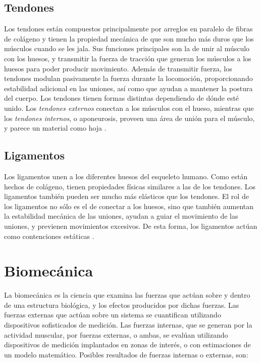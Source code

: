 \subsection{Tendones}

Los tendones están compuestos principalmente por arreglos en paralelo de fibras de colágeno y tienen la propiedad mecánica de que son mucho más duros que los músculos cuando se les jala. Sus funciones principales son la de unir al músculo con los huesos, y transmitir la fuerza de tracción que generan los músculos a los huesos para poder producir movimiento. Además de transmitir fuerza, los tendones modulan pasivamente la fuerza durante la locomoción, proporcionando estabilidad adicional en las uniones, así como que ayudan a mantener la postura del cuerpo. Los tendones tienen formas distintas dependiendo de dónde esté unido. Los \textit{tendones externos} conectan a los músculos con el hueso, mientras que los \textit{tendones internos}, o aponeurosis, proveen una área de unión para el músculo, y parece un material como hoja \citep{oatis2009kynesiology, biomechanics2012nordin}.

\subsection{Ligamentos}

Los ligamentos unen a los diferentes huesos del esqueleto humano. Como están hechos de colágeno, tienen propiedades físicas similares a las de los tendones. Los ligamentos también pueden ser mucho más elásticos que los tendones. El rol de los ligamentos no sólo es el de conectar a los huesos, sino que también aumentan la estabilidad mecánica de las uniones, ayudan a guiar el movimiento de las uniones, y previenen movimientos excesivos. De esta forma, los ligamentos actúan como contenciones estáticas \citep{oatis2009kynesiology, biomechanics2012nordin}.

\section{Biomecánica }

La biomecánica es la ciencia que examina las fuerzas que actúan sobre y dentro de una estructura biológica, y los efectos producidos por dichas fuerzas. Las fuerzas externas que actúan sobre un sistema se cuantifican utilizando dispositivos sofisticados de medición. Las fuerzas internas, que se generan por la actividad muscular, por fuerzas externas, o ambas, se evalúan utilizando dispositivos de medición implantados en zonas de interés, o con estimaciones de un modelo matemático. Posibles resultados de fuerzas internas o externas, son:

